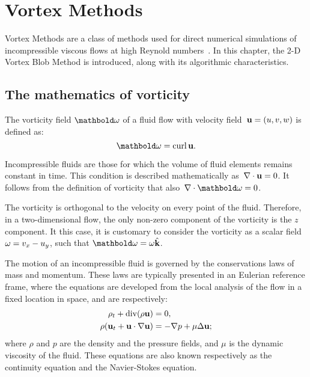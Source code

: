 \chapter{Vortex Methods}
\label{ch:vm}

Vortex Methods are a class of methods
used for direct numerical simulations
of incompressible viscous flows at high Reynold numbers~\cite{cottet00}.
In this chapter, the 2-D Vortex Blob Method is introduced,
along with its algorithmic characteristics.

\section{The mathematics of vorticity}
\label{sec:eqs-vort}

The vorticity field \(\mathbold\vort\)
of a fluid flow with velocity field~\(\mathbf u = (u, v, w)\)
is defined as:%
\begin{equation}
  \label{eq:vorticity}
  \mathbold\vort = \curl\vel.
\end{equation}

Incompressible fluids are those for which
the volume of fluid elements remains constant in time.
This condition is described mathematically as~\(\nabla\cdot\mathbf u = 0\).
It follows from the definition of vorticity that also~\(\nabla\cdot\mathbold\vort = 0\).

The vorticity is orthogonal to the velocity on every point of the fluid.
Therefore, in a two-dimensional flow,
the only non-zero component of the vorticity is the \(z\) component. 
It this case, it is customary to consider the vorticity as a scalar field
\(\omega = v_x - u_y\)\footnotemark,
such that \(\mathbold\vort = \vort\hat{\vec k}\).


The motion of an incompressible fluid
is governed by the conservations laws of mass and momentum.
These laws are typically presented in an Eulerian reference frame,
where the equations are developed from the local analysis of the flow
in a fixed location in space, and are respectively:
\begin{align}
  \rho_t + \operatorname{div}(\rho\mathbf u) &= 0, \\
  \rho(\mathbf u_t + \mathbf u\cdot\nabla\mathbf u) &= -\nabla p + \mu\Delta\mathbf u;
\end{align}
where \(\rho\) and \(p\) are the density and the pressure fields,
and \(\mu\) is the dynamic viscosity of the fluid.
These equations are also known respectively as
the continuity equation and the Navier-Stokes equation.


